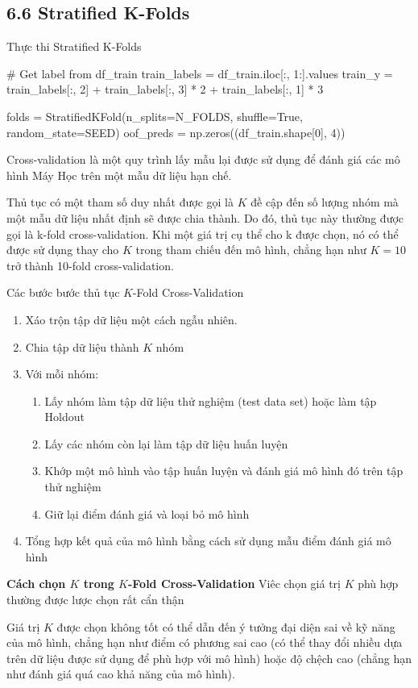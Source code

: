 \documentclass{article}
\begin{document}
	\subsection{6.6 Stratified K-Folds}
	Thực thi Stratified K-Folds
	\begin{python}
		# Get label from df_train
		train_labels = df_train.iloc[:, 1:].values
		train_y = train_labels[:, 2] + train_labels[:, 3] * 2 + train_labels[:, 1] * 3
		
		folds = StratifiedKFold(n_splits=N_FOLDS, shuffle=True, random_state=SEED)
		oof_preds = np.zeros((df_train.shape[0], 4))
	\end{python}
	Cross-validation là một quy trình lấy mẫu lại được sử dụng để đánh giá các mô hình Máy Học trên một mẫu dữ liệu hạn chế.
	
	Thủ tục có một tham số duy nhất được gọi là $K$ đề cập đến số lượng nhóm mà một mẫu dữ liệu nhất định sẽ được chia thành. Do đó, thủ tục này thường được gọi là k-fold cross-validation. Khi một giá trị cụ thể cho k được chọn, nó có thể được sử dụng thay cho $K$ trong tham chiếu đến mô hình, chẳng hạn như $K = 10$ trở thành 10-fold cross-validation.
	
	Các bước bước thủ tục $K$-Fold Cross-Validation
	\begin{enumerate}
		\item Xáo trộn tập dữ liệu một cách ngẫu nhiên.
		\item Chia tập dữ liệu thành $K$ nhóm
		\item Với mỗi nhóm:
		\begin{enumerate}
			\item Lấy nhóm làm tập dữ liệu thử nghiệm (test data set) hoặc làm tập Holdout
			\item Lấy các nhóm còn lại làm tập dữ liệu huấn luyện
			\item Khớp một mô hình vào tập huấn luyện và đánh giá mô hình đó trên tập thử nghiệm
			\item Giữ lại điểm đánh giá và loại bỏ mô hình
		\end{enumerate}
		\item Tổng hợp kết quả của mô hình bằng cách sử dụng mẫu điểm đánh giá mô hình
	\end{enumerate}
	\textbf{Cách chọn $K$ trong $K$-Fold Cross-Validation}
	Viêc chọn giá trị $K$ phù hợp thường được lược chọn rất cẩn thận
	
	Giá trị $K$ được chọn không tốt có thể dẫn đến ý tưởng đại diện sai về kỹ năng của mô hình, chẳng hạn như điểm có phương sai cao (có thể thay đổi nhiều dựa trên dữ liệu được sử dụng để phù hợp với mô hình) hoặc độ chệch cao (chẳng hạn như đánh giá quá cao khả năng của mô hình).
	
\end{document}
